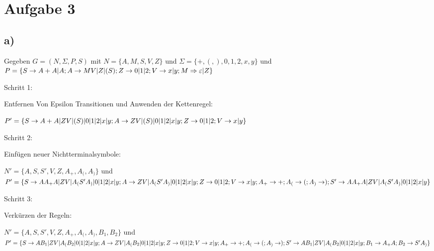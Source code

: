 \section*{Aufgabe 3}

\subsection*{a)}
Gegeben $G=(N,\Sigma , P,S)$ mit $N=\{A,M,S,V,Z\}$ und $\Sigma = \{+,(,),0,1,2,x,y\}$ und $P=\{\\
S\rightarrow A+A|A ; A\rightarrow MV|Z|(S) ;\\
Z \rightarrow 0|1|2 ;\\ V \rightarrow x|y; \\
M \Rightarrow \varepsilon | Z\}$

Schritt 1:

Entfernen Von Epsilon Transitionen und Anwenden der Kettenregel:

$P'= \{\\S \rightarrow A+A| ZV|(S)|0|1|2|x|y;\\ A \rightarrow ZV|(S)|0|1|2|x|y;\\Z \rightarrow 0|1|2;\\ V \rightarrow x|y\}$

Schritt 2:

Einfügen neuer Nichtterminalsymbole:

$N'=\{A,S,S',V,Z,A_+,A_(,A_)\}$ und $P'= \{\\S \rightarrow AA_+A| ZV|A_(S'A_)|0|1|2|x|y;\\ A \rightarrow ZV|A_(S'A_)|0|1|2|x|y;\\Z \rightarrow 0|1|2;\\ V \rightarrow x|y;\\ A_+\rightarrow +;\\ A_( \rightarrow (;\\ A_) \rightarrow );\\ S' \rightarrow AA_+A| ZV|A_(S'A_)|0|1|2|x|y\}$

Schritt 3:

Verkürzen der Regeln:

$N'=\{A,S, S',V,Z,A_+,A_(,A_), B_1, B_2\}$ und $P'= \{\\S \rightarrow AB_1| ZV|A_(B_2|0|1|2|x|y;\\ A \rightarrow ZV|A_(B_2|0|1|2|x|y;\\Z \rightarrow 0|1|2; \\V \rightarrow x|y;\\ A_+\rightarrow +;\\ A_( \rightarrow (;\\ A_) \rightarrow );\\ S' \rightarrow AB_1| ZV|A_(B_2|0|1|2|x|y;\\ B_1 \rightarrow A_+A;\\ B_2 \rightarrow S'A_)\}$


